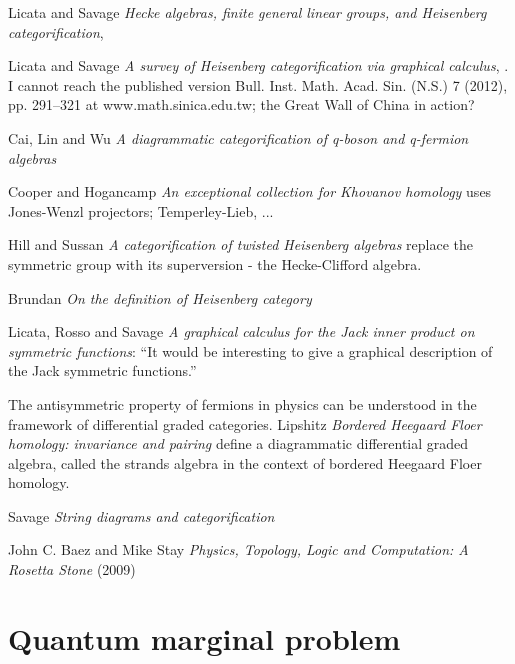 \begin{description}
Licata and Savage {\em Hecke algebras, finite general linear
groups, and {Heisenberg } categorification}, 

Licata and Savage {\em A survey of {Heisenberg}
categorification via graphical calculus},
. I cannot reach the published version
Bull. Inst. Math. Acad. Sin. (N.S.) 7 (2012), pp. 291--321
at  {www.math.sinica.edu.tw};
the Great Wall of China in action?

Cai, Lin and Wu
{\em A diagrammatic categorification of q-boson and q-fermion algebras}

Cooper and Hogancamp
{\em An exceptional collection for {Khovanov} homology} uses
Jones-Wenzl projectors; Temperley-Lieb, ...

Hill and Sussan {\em A categorification of twisted
{Heisenberg} algebras}
replace the symmetric group with its superversion - the Hecke-Clifford
algebra.


Brundan {\em On the definition of {Heisenberg} category}

Licata, Rosso and Savage {\em A graphical calculus for the
{Jack} inner product on symmetric functions}: ``It would be interesting to
give a graphical description of the Jack symmetric functions.''

The antisymmetric property of fermions in physics can be understood in
the framework of differential graded categories.
Lipshitz \etal{} {\em Bordered Heegaard Floer homology:
invariance and pairing} define a diagrammatic differential graded
algebra, called the strands algebra in the context of bordered Heegaard
Floer homology.

Savage {\em String diagrams and categorification}

John C. Baez and Mike Stay
{\em Physics, Topology, Logic and Computation:
 {A Rosetta Stone}} (2009)


\end{description}

\newpage
\section{Quantum marginal problem}
\label{s-QMP}

